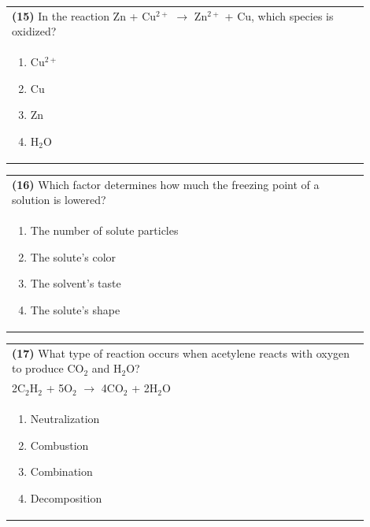 \documentclass{article}
\begin{document}
\noindent\begin{tabular}{|p{0.9\linewidth}|}
\hline
\textbf{(15)} In the reaction Zn + Cu$^{2+}$ $\rightarrow$ Zn$^{2+}$ + Cu, which species is oxidized?\\[0.2cm]
\begin{minipage}[t]{0.85\linewidth}
\begin{enumerate}[label=\alph*.]
\item Cu$^{2+}$
\item Cu
\item Zn
\item H$_2$O
\end{enumerate}
\end{minipage}\\[0.2cm]
\hline
\end{tabular}

\noindent\begin{tabular}{|p{0.9\linewidth}|}
\hline
\textbf{(16)} Which factor determines how much the freezing point of a solution is lowered?\\[0.2cm]
\begin{minipage}[t]{0.85\linewidth}
\begin{enumerate}[label=\alph*.]
\item The number of solute particles
\item The solute's color
\item The solvent's taste
\item The solute's shape
\end{enumerate}
\end{minipage}\\[0.2cm]
\hline
\end{tabular}
\newpage


\noindent\begin{tabular}{|p{0.9\linewidth}|}
\hline
\textbf{(17)} What type of reaction occurs when acetylene reacts with oxygen to produce CO$_2$ and H$_2$O?\\[0.2cm]
2C$_2$H$_2$ + 5O$_2$ $\rightarrow$ 4CO$_2$ + 2H$_2$O\\[0.2cm]
\begin{minipage}[t]{0.85\linewidth}
\begin{enumerate}[label=\alph*.]
\item Neutralization
\item Combustion
\item Combination
\item Decomposition
\end{enumerate}
\end{minipage}\\[0.2cm]
\hline
\end{tabular}
\end{document}
